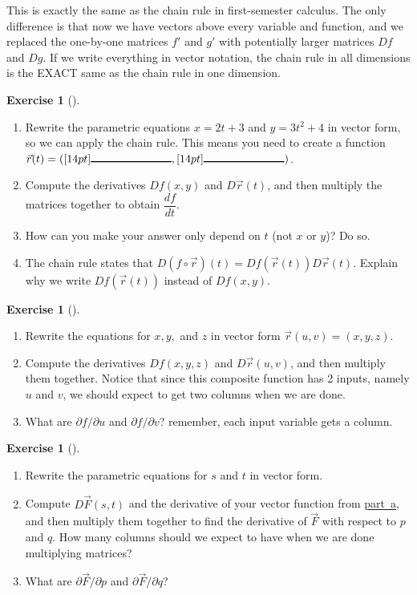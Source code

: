\documentclass[10pt,]{book}
\theoremstyle{plain}
\theoremstyle{definition}
\theoremstyle{definition}
\theoremstyle{definition}
\theoremstyle{definition}
\newtheorem{exploration}[project]{Exercise}
\theoremstyle{definition}
\numberwithin{equation}{section}
\newcommand{\blank}[1]{[14pt]{\rule{#1}{1pt}}}
\begin{document}
This is exactly the same as the chain rule in first-semester calculus. The only difference is that now we have vectors above every variable and function, and we replaced the one-by-one matrices \(f'\) and \(g'\) with potentially larger matrices \(Df\) and \(Dg\). If we write everything in vector notation, the chain rule in all dimensions is the EXACT same as the chain rule in one dimension.%
\begin{exploration}[]\label{exploration-153}
\leavevmode%
\begin{enumerate}[font=\bfseries,label=(\alph*),ref=\alph*]
\item\label{task-357} Rewrite the parametric equations \(x=2t+3\) and \(y=3t^2+4\) in vector form, so we can apply the chain rule. This means you need to create a function \(\vec r(t) = (\blank{1in}, \blank{1in})\).%
\item\label{task-358} Compute the derivatives \(Df(x,y)\) and \(D\vec r(t)\), and then multiply the matrices together to obtain \(\dfrac{df}{dt}\).%
\item\label{task-359} How can you make your answer only depend on \(t\) (not \(x\) or \(y\))? Do so.%
\item\label{task-360} The chain rule states that \(D(f\circ \vec r)(t) = Df(\vec r(t))D\vec r(t)\). Explain why we write \(Df(\vec r(t))\) instead of \(Df(x,y)\).%
\end{enumerate}
\end{exploration}
\begin{exploration}[]\label{exploration-154}
\leavevmode%
\begin{enumerate}[font=\bfseries,label=(\alph*),ref=\alph*]
\item\label{task-361} Rewrite the equations for \(x,y,\) and \(z\) in vector form \(\vec r(u,v)=(x,y,z)\).%
\item\label{task-362} Compute the derivatives \(Df(x,y,z)\) and \(D\vec r(u,v)\), and then multiply them together. Notice that since this composite function has 2 inputs, namely \(u\) and \(v\), we should expect to get two columns when we are done.%
\item\label{task-363} What are \(\partial f/\partial u\) and \(\partial f/\partial v\)? remember, each input variable gets a column.%
%
\end{enumerate}
\end{exploration}
\begin{exploration}[]\label{exploration-155}
\leavevmode%
\begin{enumerate}[font=\bfseries,label=(\alph*),ref=\alph*]
\item\label{item_3} Rewrite the parametric equations for \(s\) and \(t\) in vector form.%
\item\label{task-365} Compute \(D\vec F(s,t)\) and the derivative of your vector function from \hyperref[item_3]{part~a}, and then multiply them together to find the derivative of \(\vec F\) with respect to \(p\) and \(q\).  How many columns should we expect to have when we are done multiplying matrices?%
\item\label{task-366} What are \(\partial \vec F/\partial p\) and \(\partial \vec F/\partial q\)?%
\end{enumerate}
\end{exploration}
\end{document}
